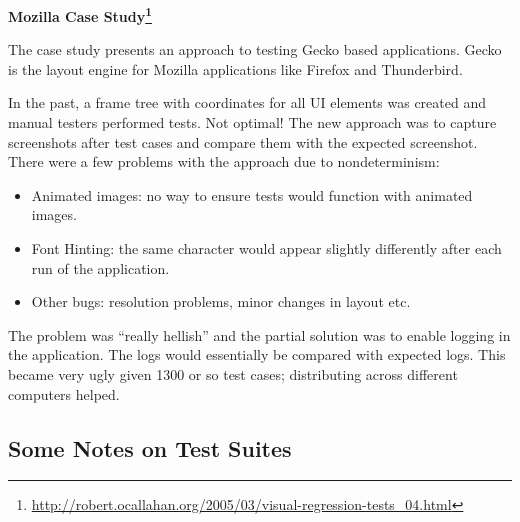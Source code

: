 \documentclass[11pt]{article}
\begin{document}
\textbf{Mozilla Case Study\footnote{\url{http://robert.ocallahan.org/2005/03/visual-regression-tests_04.html}}}

The case study presents an approach to testing Gecko based applications. Gecko is the layout engine for Mozilla applications like Firefox and Thunderbird. 

In the past, a frame tree with coordinates for all UI elements was created and manual testers performed tests. Not optimal! The new approach was to capture screenshots after test cases and compare them with the expected screenshot. There were a few problems with the approach due to nondeterminism: 

\begin{itemize}[noitemsep]
\item Animated images: no way to ensure tests would function with animated images.
\item Font Hinting: the same character would appear slightly differently after each run of the application.
\item Other bugs: resolution problems, minor changes in layout etc.
\end{itemize}

The problem was ``really hellish'' and the partial solution was to enable logging in the application. The logs would essentially be compared with expected logs. This became very ugly given 1300 or so test cases; distributing across different computers helped.

\subsection*{Some Notes on Test Suites}
\end{document}
